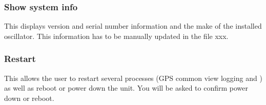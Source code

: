 \subsubsection{Show system info}

This displays version and serial number information and the make of the installed oscillator.
This information has to be manually updated in the file xxx.
  
\subsubsection{Restart}

This allows the user to restart several processes (GPS common view logging and ) as well as reboot or power down the unit. 
You will be asked to confirm power down or reboot.
